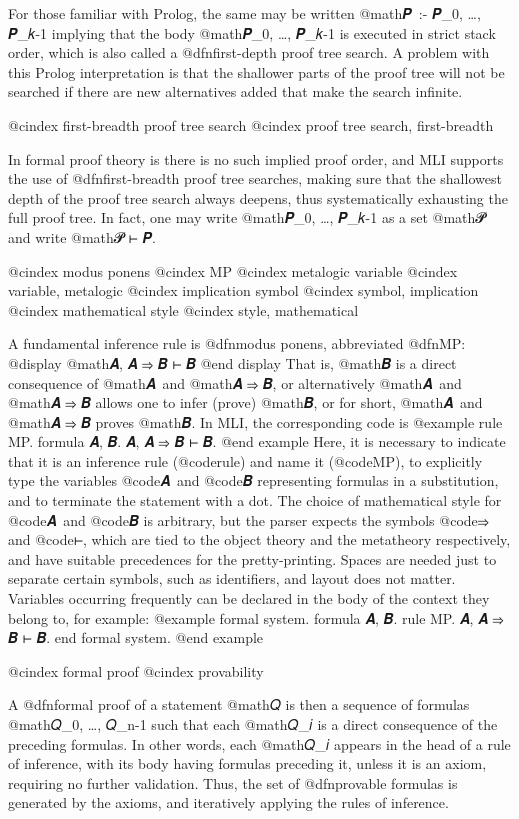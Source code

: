 For those familiar with Prolog, the same may be written
@math{𝑷 \,{:}{-} 𝑷_0, …, 𝑷_{𝑘-1}}
implying that the body @math{𝑷_0, …, 𝑷_{𝑘-1}} is executed in strict stack order, which is also called a @dfn{first-depth} proof tree search. A problem with this Prolog interpretation is that the shallower parts of the proof tree will not be searched if there are new alternatives added that make the search infinite.


@cindex first-breadth proof tree search
@cindex proof tree search, first-breadth

In formal proof theory is there is no such implied proof order, and MLI supports the use of @dfn{first-breadth} proof tree searches, making sure that the shallowest depth of the proof tree search always deepens, thus systematically exhausting the full proof tree. In fact, one may write @math{𝑷_0, …, 𝑷_{𝑘-1}} as a set @math{𝓟} and write @math{𝓟 ⊢ 𝑷}.


@cindex modus ponens
@cindex MP
@cindex metalogic variable
@cindex variable, metalogic
@cindex implication symbol
@cindex symbol, implication
@cindex mathematical style
@cindex style, mathematical

A fundamental inference rule is @dfn{modus ponens}, abbreviated @dfn{MP}:
@display
@math{𝑨, 𝑨 ⇒ 𝑩 ⊢ 𝑩}
@end display
That is, @math{𝑩} is a direct consequence of @math{𝑨} and @math{𝑨 ⇒ 𝑩}, or alternatively @math{𝑨} and @math{𝑨 ⇒ 𝑩} allows one to infer (prove) @math{𝑩}, or for short, @math{𝑨} and @math{𝑨 ⇒ 𝑩} proves @math{𝑩}.
In MLI, the corresponding code is
@example
rule MP. formula 𝑨, 𝑩. 𝑨, 𝑨 ⇒ 𝑩 ⊢ 𝑩.
@end example
Here, it is necessary to indicate that it is an inference rule (@code{rule}) and name it (@code{MP}), to explicitly type the variables @code{𝑨} and @code{𝑩} representing formulas in a substitution, and to terminate the statement with a dot. The choice of mathematical style for @code{𝑨} and @code{𝑩} is arbitrary, but the parser expects the symbols @code{⇒} and @code{⊢}, which are tied to the object theory and the metatheory respectively, and have suitable precedences for the pretty-printing. Spaces are needed just to separate certain symbols, such as identifiers, and layout does not matter. Variables occurring frequently can be declared in the body of the context they belong to, for example:
@example
formal system.
  formula 𝑨, 𝑩.
  rule MP. 𝑨, 𝑨 ⇒ 𝑩 ⊢ 𝑩.
end formal system.
@end example


@cindex formal proof
@cindex provability

A @dfn{formal proof} of a statement @math{𝑄} is then a sequence of formulas @math{𝑄_0, …, 𝑄_{n-1}} such that each @math{𝑄_𝑖} is a direct consequence of the preceding formulas. In other words, each @math{𝑄_𝑖} appears in the head of a rule of inference, with its body having formulas preceding it, unless it is an axiom, requiring no further validation. Thus, the set of @dfn{provable} formulas is generated by the axioms, and iteratively applying the rules of inference.

